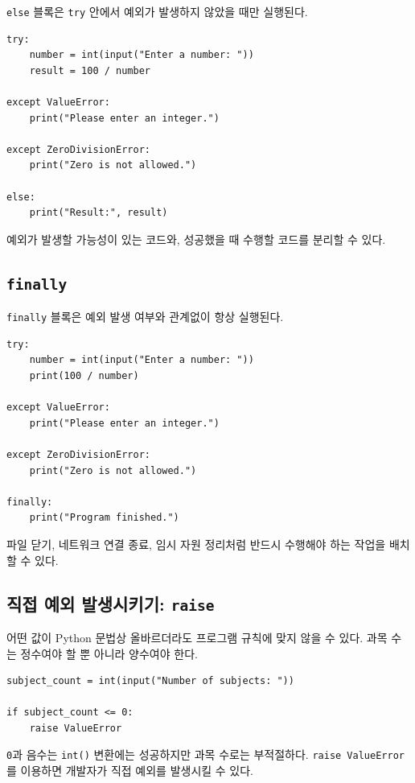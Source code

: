 \documentclass[11pt,a4paper]{article}
\begin{document}
\texttt{else} 블록은 \texttt{try} 안에서 예외가 발생하지 않았을 때만 실행된다.

\begin{lstlisting}
try:
    number = int(input("Enter a number: "))
    result = 100 / number

except ValueError:
    print("Please enter an integer.")

except ZeroDivisionError:
    print("Zero is not allowed.")

else:
    print("Result:", result)
\end{lstlisting}

예외가 발생할 가능성이 있는 코드와, 성공했을 때 수행할 코드를 분리할 수 있다.

\subsection{\texttt{finally}}

\texttt{finally} 블록은 예외 발생 여부와 관계없이 항상 실행된다.

\begin{lstlisting}
try:
    number = int(input("Enter a number: "))
    print(100 / number)

except ValueError:
    print("Please enter an integer.")

except ZeroDivisionError:
    print("Zero is not allowed.")

finally:
    print("Program finished.")
\end{lstlisting}

파일 닫기, 네트워크 연결 종료, 임시 자원 정리처럼 반드시 수행해야 하는 작업을 배치할 수 있다.

\subsection{직접 예외 발생시키기: \texttt{raise}}

어떤 값이 Python 문법상 올바르더라도 프로그램 규칙에 맞지 않을 수 있다. 과목 수는 정수여야 할 뿐 아니라 양수여야 한다.

\begin{lstlisting}
subject_count = int(input("Number of subjects: "))

if subject_count <= 0:
    raise ValueError
\end{lstlisting}

\texttt{0}과 음수는 \texttt{int()} 변환에는 성공하지만 과목 수로는 부적절하다. \texttt{raise ValueError}를 이용하면 개발자가 직접 예외를 발생시킬 수 있다.
\end{document}

